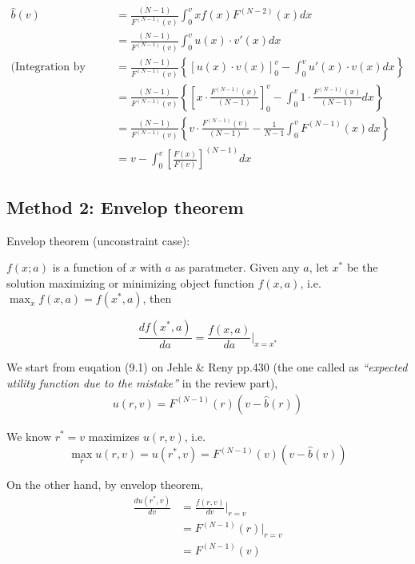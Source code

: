 \documentclass{article}
\begin{document}
\begin{align*}
\hat{b}(v)&= \frac{(N-1)}{F^{(N-1)}(v)} \int_0^{v}xf(x)F^{(N-2)}(x)dx \\
&= \frac{(N-1)}{F^{(N-1)}(v)} \int_0^{v} u(x)\cdot v'(x)dx \\
\text{(Integration by parts:)}\quad &=\frac{(N-1)}{F^{(N-1)}(v)} \left\{\left[u(x) \cdot v(x)\right]_0^v - \int_0^v u'(x) \cdot v(x) dx\right\} \\
&=\frac{(N-1)}{F^{(N-1)}(v)}  \left\{\left[x \cdot \frac{F^{(N-1)}(x)}{(N-1)}\right]_0^v - \int_0^v 1 \cdot \frac{F^{(N-1)}(x)}{(N-1)} dx \right\} \\
&=\frac{(N-1)}{F^{(N-1)}(v)}  \left\{v \cdot \frac{F^{(N-1)}(v)}{(N-1)} -   \frac{1}{N-1} \int_0^v F^{(N-1)}(x) dx \right\} \\
&= v -  \int_0^v \left[\frac{F(x)}{F(v)}\right]^{(N-1)} dx 
\end{align*}

\subsection*{Method 2: Envelop theorem}


\begin{mdframed}[backgroundcolor=blue!20,linecolor=white]
Envelop theorem (unconstraint case):

\medskip

$f(x;a)$ is a function of $x$ with $a$ as paratmeter. Given any $a$, let $x^*$ be the solution maximizing or minimizing object function $f(x,a)$, i.e. $\max_{x} f(x,a)= f(x^*,a)$, then

$$\frac{d f(x^*,a)}{d a} = \frac{f(x,a)}{d a} \bigg\rvert_{x=x^*} $$
\end{mdframed}

We start from euqation (9.1) on Jehle \& Reny pp.430 (the one called as \textit{``expected utility function due to the mistake''} in the review part),
\begin{align*}
u(r,v)= F^{(N-1)}(r) (v-\hat{b}(r))
\end{align*}

We know $r^*=v$ maximizes $u(r,v)$, i.e. 
\begin{equation}
\max_r u(r,v) = u(r^*,v)=F^{(N-1)}(v) (v-\hat{b}(v))
    \label{eq:max1}   
\end{equation}

On the other hand, by envelop theorem,
\begin{align*}
\frac{d u(r^*,v)}{d v} &= \frac{f(r,v)}{d v} \bigg\rvert_{r=v} \\
&= F^{(N-1)}(r) \bigg\rvert_{r=v} \\
&=F^{(N-1)}(v)
\end{align*}
\end{document}
